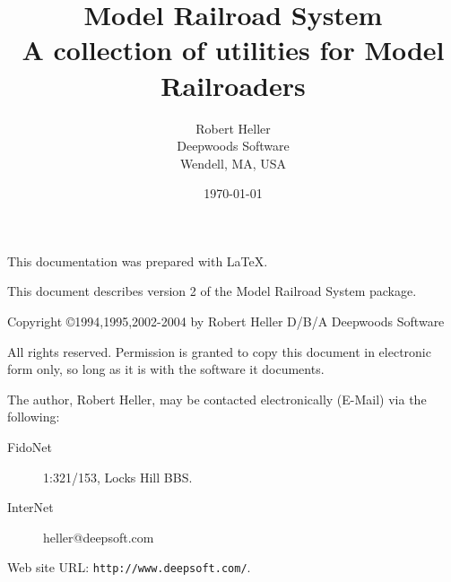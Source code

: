 \title{Model Railroad System \\ A collection of utilities for Model Railroaders\\ \MRRSubTitle}
\author{Robert Heller \\ Deepwoods Software \\ Wendell, MA, USA}
\date{\today}
\begin{titlepage}

\maketitle


\clearpage


This documentation was prepared with \LaTeX.

This document describes version 2 of the Model Railroad System package.

\vspace{.25in}



{\small Copyright \copyright 1994,1995,2002-2004 by Robert Heller D/B/A Deepwoods
Software}

\vspace{.25in}

All rights reserved.  Permission is granted to copy this document in
electronic form only, so long as it is with the software it
documents. 

The author, Robert Heller, may be contacted electronically (E-Mail) via
the following:

\begin{description}
\item[FidoNet] 1:321/153, Locks Hill BBS.
\item[InterNet] heller@deepsoft.com
\end{description}

Web site URL: {\tt http://www.deepsoft.com/}.

\thispagestyle{empty}
\setcounter{page}{0}
\clearpage

\end{titlepage}

